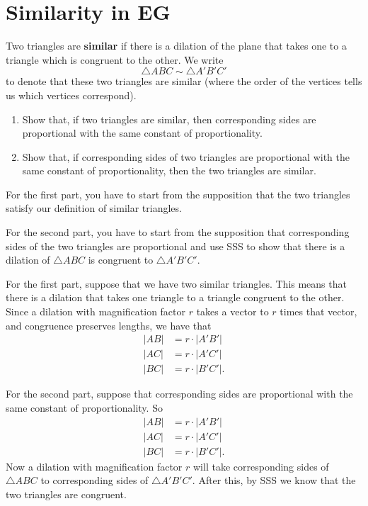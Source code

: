\documentclass[newpage,hints,handout]{ximera}
\begin{document}
\section{Similarity in \textbf{EG}}

\begin{definition}
Two triangles are \textbf{similar} if there is a dilation of the
plane that takes one to a triangle which is congruent to the other. We write%
\[
\triangle ABC\sim\triangle A'B'C'%
\]
to denote that these two triangles are similar (where the order of the
vertices tells us which vertices correspond).
\end{definition}

\begin{problem}\hfil
\begin{enumerate}
\item Show that, if two triangles are similar, then corresponding
sides are proportional with the same constant of proportionality.

\item Show that, if corresponding sides of two triangles are
  proportional with the same constant of proportionality, then the two
  triangles are similar.


\end{enumerate}
\begin{hint}
For the first part, you have to start from the supposition that the
two triangles satisfy our definition of similar triangles.
\end{hint}
\begin{hint}
For the second part, you have to start from the supposition that
corresponding sides of the two triangles are proportional and use SSS
to show that there is a dilation of $\triangle ABC$ is congruent to
$\triangle A'B'C'$.
\end{hint}
\begin{freeResponse}
For the first part, suppose that we have two similar triangles. This
means that there is a dilation that takes one triangle to a triangle
congruent to the other. Since a dilation with magnification factor
$r$ takes a vector to $r$ times that vector, and congruence preserves
lengths, we have that
\begin{align*}
|AB| &= r\cdot |A'B'|\\
|AC| &= r\cdot |A'C'|\\
|BC| &= r\cdot |B'C'|.
\end{align*}


For the second part, suppose that corresponding sides are proportional
with the same constant of proportionality. So
\begin{align*}
|AB| &= r\cdot |A'B'|\\
|AC| &= r\cdot |A'C'|\\
|BC| &= r\cdot |B'C'|.
\end{align*}
Now a dilation with magnification factor $r$ will take corresponding
sides of $\triangle ABC$ to corresponding sides of $\triangle
A'B'C'$. After this, by SSS we know that the two triangles are
congruent.
\end{freeResponse}
\end{problem}
\end{document}
